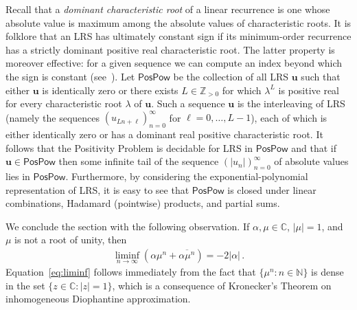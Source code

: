 \documentclass[a4paper,UKenglish,cleveref, autoref, thm-restate]{lipics-v2021}
\begin{document}
Recall that a \emph{dominant characteristic root} of a linear recurrence is one whose absolute value 
is maximum among the absolute values of characteristic roots.
It is folklore that an LRS has ultimately constant sign if its minimum-order recurrence has a strictly 
dominant positive real characteristic root.  The latter property is moreover effective: for a given sequence
we can compute an index beyond which the sign is constant
(see~\cite[Section 4.1]{OuaknineW14}).  Let $\mathsf{PosPow}$ be the collection
of all LRS $\boldsymbol u$ such that either $\boldsymbol u$ is identically zero or
there exists $L \in \mathbb Z_{>0}$ for which  $\lambda^L$ is positive real for every characteristic
root $\lambda$ of $\boldsymbol u$.  
Such a sequence  $\boldsymbol u$ is the interleaving of  LRS
(namely the sequences
$(u_{Ln+\ell})_{n=0}^\infty$ for $\ell=0,\ldots,L-1$), each of which
is either identically zero or has
a dominant real positive characteristic root. 
It follows that the Positivity Problem is decidable for
LRS in $\mathsf{PosPow}$ and that
if $\boldsymbol u \in \mathsf{PosPow}$ then some 
infinite tail of the sequence $(|u_n|)_{n=0}^\infty$ of absolute 
values lies in $\mathsf{PosPow}$.  Furthermore,
by considering the exponential-polynomial representation of LRS, it is
easy to see that $\mathsf{PosPow}$ is closed under
linear combinations, Hadamard (pointwise) products, and partial sums.

We conclude the section with the following observation.  If
$\alpha,\mu \in \mathbb C$, $|\mu|=1$, and $\mu$ is not a
root of unity, then
\begin{gather}
\liminf_{n\rightarrow \infty} (\alpha\mu^n + \overline{\alpha
\mu^n}) = - 2|\alpha| \, .
  \label{eq:liminf}
\end{gather}
Equation~\eqref{eq:liminf} follows immediately from the fact that $\{
\mu^n : n\in \mathbb N\}$ is dense in the set $\{z \in \mathbb C:|z|=1\}$, which is a consequence
of Kronecker's Theorem on inhomogeneous Diophantine approximation.
\end{document}
